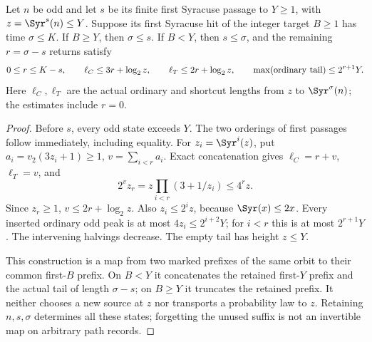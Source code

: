 \begin{lemma}
\label{lem:Shaik-same-orbit-tail}
Let \(n\) be odd and let \(s\) be its finite first Syracuse
passage to \(Y\ge1\), with \(z=\Syr^s(n)\le Y\).
Suppose its first Syracuse hit of the integer target \(B\ge1\)
has time \(\sigma\le K\).
If \(B\ge Y\), then \(\sigma\le s\). If \(B<Y\), then
\(s\le\sigma\), and the remaining \(r=\sigma-s\) returns satisfy
\begin{equation}\label{eq:Shaik-exact-tail}
 0\le r\le K-s,\qquad
 \ell_C\le3r+\log_2 z,\qquad
 \ell_T\le2r+\log_2 z,\qquad
 \max({\rm ordinary\ tail})\le2^{r+1}Y.
\end{equation}
Here \(\ell_C,\ell_T\) are the actual ordinary and shortcut lengths
from \(z\) to \(\Syr^\sigma(n)\); the estimates include \(r=0\).
\end{lemma}
\begin{proof}
Before \(s\), every odd state exceeds \(Y\). The two orderings of
first passages follow immediately, including equality.
For \(z_i=\Syr^i(z)\), put
\(a_i=v_2(3z_i+1)\ge1\), \(v=\sum_{i<r}a_i\).
Exact concatenation gives \(\ell_C=r+v\), \(\ell_T=v\), and
\[
 2^v z_r=z\prod_{i<r}(3+1/z_i)\le4^rz.
\]
Since \(z_r\ge1\), \(v\le2r+\log_2z\).
Also \(z_i\le2^iz\), because \(\Syr(x)\le2x\).
Every inserted ordinary odd peak is at most
\(4z_i\le2^{i+2}Y\); for \(i<r\) this is at most \(2^{r+1}Y\).
The intervening halvings decrease. The empty tail has height \(z\le Y\).

This construction is a map from two marked prefixes of the same
orbit to their common first-\(B\) prefix. On \(B<Y\) it concatenates
the retained first-\(Y\) prefix and the actual tail of length
\(\sigma-s\); on \(B\ge Y\) it truncates the retained prefix.
It neither chooses a new source at \(z\) nor transports a probability
law to \(z\). Retaining \(n,s,\sigma\) determines all these states;
forgetting the unused suffix is not an invertible map on arbitrary
path records.
\end{proof}

